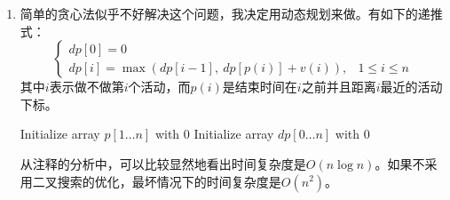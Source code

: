 \documentclass{ctexart}
\begin{document}
\begin{enumerate}[label=\arabic*.]
\begin{enumerate}[label=(\arabic*)]
                接下来对$n=k$试图归纳。假设已经将$S_1,\dots,S_k$替换为了贪心解的$S^*_1,\dots,S^*_k$。接下来我们试图用$S^*_{k+1}$替换$S_{k+1}$，显然由贪心算法，这一步既满足$S^*_k$的限制，也因为$S^*_{k+1}\le S_{k+1}$不影响后续的活动安排。\\
                因此归纳成立，非贪心解可以经过有限步变成贪心解。故贪心算法正确。
            \item 简单的贪心法似乎不好解决这个问题，我决定用动态规划来做。有如下的递推式：
                \[\begin{cases}
                    dp[0] = 0 \\
                    dp[i] = \max(dp[i-1], \ dp[p(i)] + v(i)), & 1 \le i \le n
                \end{cases}\]其中$i$表示做不做第$i$个活动，而$p(i)$是结束时间在$i$之前并且距离$i$最近的活动下标。\\
                \begin{algorithm}[H]
                    \caption{动态规划求解带权重的广告选择问题}
                    Initialize array $p[1 \dots n]$ with $0$\;
                    Initialize array $dp[0 \dots n]$ with $0$\;
                    \;
                \end{algorithm}
                从注释的分析中，可以比较显然地看出时间复杂度是$O(n\log n)$。如果不采用二叉搜索的优化，最坏情况下的时间复杂度是$O(n^2)$。

\end{enumerate}
\end{enumerate}
\end{document}
